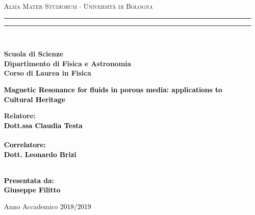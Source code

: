 \documentclass[a4paper,11pt]{report}
\begin{document}
\begin{titlepage}
%
%
%
%
\begin{center}
{{\Large{\textsc{Alma Mater Studiorum $\cdot$ Universit\`a di Bologna}}}} 
\rule[0.1cm]{15.8cm}{0.1mm}
\rule[0.5cm]{15.8cm}{0.6mm}
\\\vspace{3mm}

{\small{\bf Scuola di Scienze \\ 
Dipartimento di Fisica e Astronomia\\
Corso di Laurea in Fisica}}

\end{center}

\vspace{23mm}

\begin{center}\textcolor{black}{
%
%
{\LARGE{\bf Magnetic Resonance for fluids in porous media: applications to Cultural Heritage}}\\
}\end{center}

\vspace{50mm} \par \noindent

\begin{minipage}[t]{0.47\textwidth}
%
%
{\large{\bf Relatore: \vspace{2mm}\\\textcolor{black}{
Dott.ssa Claudia Testa}\\\\
%
%
%
\textcolor{black}{
\bf Correlatore:
\vspace{2mm}\\
Dott. Leonardo Brizi\\\\}}}
\end{minipage}
%
\hfill
%
\begin{minipage}[t]{0.47\textwidth}\raggedleft \textcolor{black}{
{\large{\bf Presentata da:
\vspace{2mm}\\
%
%
Giuseppe Filitto}}}
\end{minipage}

\vspace{40mm}

\begin{center}
%
%
Anno Accademico \textcolor{black}{2018/2019}
\end{center}

\end{titlepage}
\end{document}
